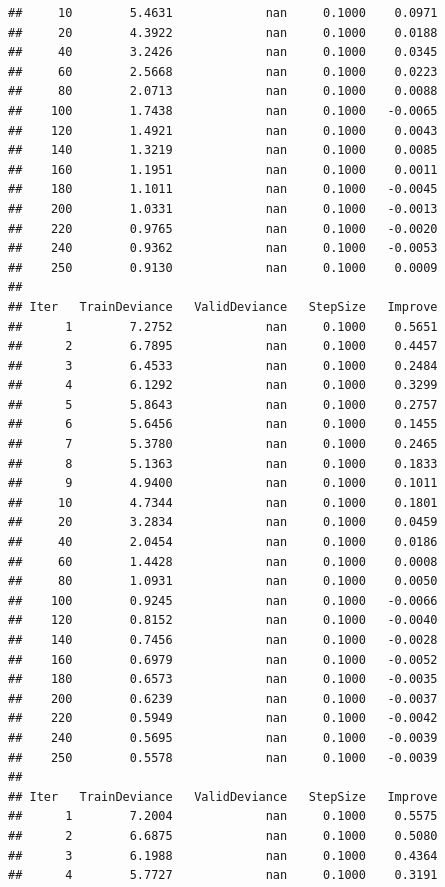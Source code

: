 \documentclass[
]{book}
\begin{document}
\begin{verbatim}
##     10        5.4631             nan     0.1000    0.0971
##     20        4.3922             nan     0.1000    0.0188
##     40        3.2426             nan     0.1000    0.0345
##     60        2.5668             nan     0.1000    0.0223
##     80        2.0713             nan     0.1000    0.0088
##    100        1.7438             nan     0.1000   -0.0065
##    120        1.4921             nan     0.1000    0.0043
##    140        1.3219             nan     0.1000    0.0085
##    160        1.1951             nan     0.1000    0.0011
##    180        1.1011             nan     0.1000   -0.0045
##    200        1.0331             nan     0.1000   -0.0013
##    220        0.9765             nan     0.1000   -0.0020
##    240        0.9362             nan     0.1000   -0.0053
##    250        0.9130             nan     0.1000    0.0009
## 
## Iter   TrainDeviance   ValidDeviance   StepSize   Improve
##      1        7.2752             nan     0.1000    0.5651
##      2        6.7895             nan     0.1000    0.4457
##      3        6.4533             nan     0.1000    0.2484
##      4        6.1292             nan     0.1000    0.3299
##      5        5.8643             nan     0.1000    0.2757
##      6        5.6456             nan     0.1000    0.1455
##      7        5.3780             nan     0.1000    0.2465
##      8        5.1363             nan     0.1000    0.1833
##      9        4.9400             nan     0.1000    0.1011
##     10        4.7344             nan     0.1000    0.1801
##     20        3.2834             nan     0.1000    0.0459
##     40        2.0454             nan     0.1000    0.0186
##     60        1.4428             nan     0.1000    0.0008
##     80        1.0931             nan     0.1000    0.0050
##    100        0.9245             nan     0.1000   -0.0066
##    120        0.8152             nan     0.1000   -0.0040
##    140        0.7456             nan     0.1000   -0.0028
##    160        0.6979             nan     0.1000   -0.0052
##    180        0.6573             nan     0.1000   -0.0035
##    200        0.6239             nan     0.1000   -0.0037
##    220        0.5949             nan     0.1000   -0.0042
##    240        0.5695             nan     0.1000   -0.0039
##    250        0.5578             nan     0.1000   -0.0039
## 
## Iter   TrainDeviance   ValidDeviance   StepSize   Improve
##      1        7.2004             nan     0.1000    0.5575
##      2        6.6875             nan     0.1000    0.5080
##      3        6.1988             nan     0.1000    0.4364
##      4        5.7727             nan     0.1000    0.3191

\end{verbatim}
\end{document}

